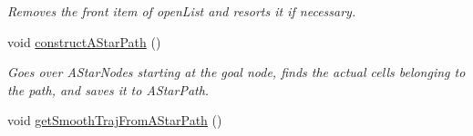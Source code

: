 \begin{DoxyCompactItemize}
\begin{DoxyCompactList}\small\item\em Removes the front item of open\-List and resorts it if necessary. \end{DoxyCompactList}\item 
\hypertarget{classSquirrelMotionPlanner_1_1Planner_a4736f700b52b48e04f5c4b6fe7101fbf}{void \hyperlink{classSquirrelMotionPlanner_1_1Planner_a4736f700b52b48e04f5c4b6fe7101fbf}{construct\-A\-Star\-Path} ()}\label{classSquirrelMotionPlanner_1_1Planner_a4736f700b52b48e04f5c4b6fe7101fbf}

\begin{DoxyCompactList}\small\item\em Goes over A\-Star\-Nodes starting at the goal node, finds the actual cells belonging to the path, and saves it to A\-Star\-Path. \end{DoxyCompactList}\item 
\hypertarget{classSquirrelMotionPlanner_1_1Planner_a8c4b5aacc6c337a767f4b880bc8e6b43}{void \hyperlink{classSquirrelMotionPlanner_1_1Planner_a8c4b5aacc6c337a767f4b880bc8e6b43}{get\-Smooth\-Traj\-From\-A\-Star\-Path} ()}\label{classSquirrelMotionPlanner_1_1Planner_a8c4b5aacc6c337a767f4b880bc8e6b43}


\end{DoxyCompactItemize}
